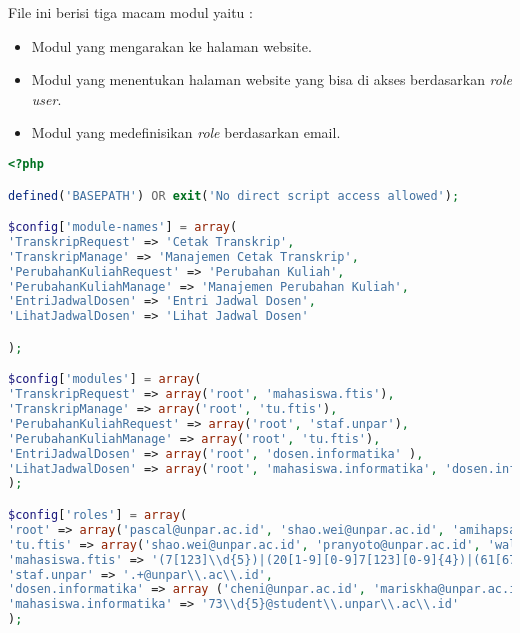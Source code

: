 File ini berisi tiga macam modul yaitu :
\begin{itemize}
	\item Modul yang mengarakan ke halaman website.
	\item Modul yang menentukan halaman website yang bisa di akses berdasarkan \textit{role user}.
	\item Modul yang medefinisikan \textit{role} berdasarkan email.
\end{itemize}
\begin{lstlisting}[language=PHP, caption=Penambahan email admin., label=Entri, basicstyle=\footnotesize\ttfamily, frame=single,
columns=fullflexible, keepspaces=true, breaklines=true, showstringspaces=false]
<?php

defined('BASEPATH') OR exit('No direct script access allowed');

$config['module-names'] = array(
'TranskripRequest' => 'Cetak Transkrip',
'TranskripManage' => 'Manajemen Cetak Transkrip',
'PerubahanKuliahRequest' => 'Perubahan Kuliah',
'PerubahanKuliahManage' => 'Manajemen Perubahan Kuliah',
'EntriJadwalDosen' => 'Entri Jadwal Dosen',
'LihatJadwalDosen' => 'Lihat Jadwal Dosen'

);

$config['modules'] = array(
'TranskripRequest' => array('root', 'mahasiswa.ftis'),
'TranskripManage' => array('root', 'tu.ftis'),
'PerubahanKuliahRequest' => array('root', 'staf.unpar'),
'PerubahanKuliahManage' => array('root', 'tu.ftis'),
'EntriJadwalDosen' => array('root', 'dosen.informatika' ),
'LihatJadwalDosen' => array('root', 'mahasiswa.informatika', 'dosen.informatika')
);

$config['roles'] = array(
'root' => array('pascal@unpar.ac.id', 'shao.wei@unpar.ac.id', 'amihapsahapsa@gmail.com'),
'tu.ftis' => array('shao.wei@unpar.ac.id', 'pranyoto@unpar.ac.id', 'walip@unpar.ac.id', 'dwina@unpar.ac.id'),
'mahasiswa.ftis' => '(7[123]\\d{5})|(20[1-9][0-9]7[123][0-9]{4})|(61[678][0-9]{7})@student\\.unpar\\.ac\\.id',
'staf.unpar' => '.+@unpar\\.ac\\.id',
'dosen.informatika' => array ('cheni@unpar.ac.id', 'mariskha@unpar.ac.id', 'anung@unpar.ac.id', 'moertini@unpar.ac.id', 'natalia@unpar.ac.id', 'chandraw@unpar.ac.id', 'elisatih@unpar.ac.id', 'gkarya@unpar.ac.id', 'husnulhakim@unpar.ac.id', 'joanna@unpar.ac.id', 'lionov@unpar.ac.id', 'luciana@unpar.ac.id', 'pascal@unpar.ac.id', 'rosad5@unpar.ac.id', 'vania.natali@unpar.ac.id', 'kristopher.h@unpar.ac.id', 'raymond.chandra@unpar.ac.id', 'keenan.leman@unpar.ac.id'),
'mahasiswa.informatika' => '73\\d{5}@student\\.unpar\\.ac\\.id'
);
\end{lstlisting}

